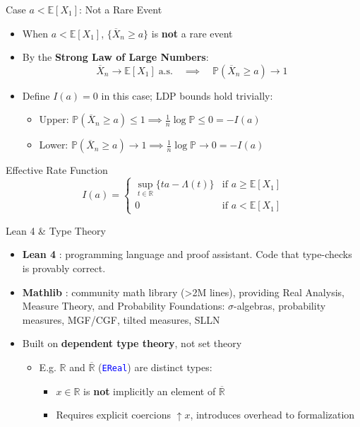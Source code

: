 \documentclass[aspectratio=169]{beamer}
\newcommand{\E}{\mathbb{E}}
\renewcommand{\P}{\mathbb{P}}
\newcommand{\R}{\mathbb{R}}
\newcommand{\leancode}[1]{\textcolor{blue}{\nolinkurl{#1}}}
\begin{document}
\begin{frame}{Case $a < \E[X_1]$: Not a Rare Event}
  \begin{itemize}
    \item When $a < \E[X_1]$, $\{\overline{X}_n \ge a\}$ is \textbf{not} a rare event
    \item By the \textbf{Strong Law of Large Numbers}:
      \[
        \overline{X}_n \to \E[X_1] \;\text{a.s.} \quad \implies \quad \P(\overline{X}_n \ge a) \to 1
      \]
    \item Define $I(a) = 0$ in this case; LDP bounds hold trivially:
      \begin{itemize}
        \item Upper: $\P(\overline{X}_n \ge a) \le 1 \implies \frac{1}{n}\log\P \le 0 = -I(a)$
        \item Lower: $\P(\overline{X}_n \ge a) \to 1 \implies \frac{1}{n}\log\P \to 0 = -I(a)$
      \end{itemize}
  \end{itemize}
  \vspace{0.2cm}
  \begin{block}{Effective Rate Function}
    \[
      I(a) =
      \begin{cases}
        \sup_{t \in \R}\{ta - \Lambda(t)\} & \text{if } a \ge \E[X_1] \\
        0 & \text{if } a < \E[X_1]
      \end{cases}
    \]
  \end{block}
\end{frame}


\begin{frame}{Lean 4 \& Type Theory}
  \begin{itemize}
    \item \textbf{Lean 4} \cite{demoura2021lean4}: programming language and proof assistant. Code that type-checks is provably correct.
    \item \textbf{Mathlib} \cite{mathlib2020}: community math library (>2M lines), providing Real Analysis, Measure Theory, and Probability Foundations:
      $\sigma$-algebras, probability measures, MGF/CGF, tilted measures, SLLN
      \vspace{0.2cm}
    \item Built on \textbf{dependent type theory}, not set theory
      \begin{itemize}
        \item E.g. $\R$ and $\overline{\R}$ (\leancode{EReal}) are distinct types:
          \begin{itemize}
            \item $x \in \R$ is \textbf{not} implicitly an element of $\overline{\R}$
            \item Requires explicit coercions $\uparrow\! x$, introduces overhead to formalization
          \end{itemize}
      \end{itemize}
  \end{itemize}
\end{frame}
\end{document}
